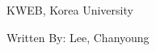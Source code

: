 \begin{titlepage}
    \centering
    \vspace*{35mm}
    \par\vspace{5mm}
    {\large KWEB, Korea University}
    \par\vspace{20mm}
    {\booktitle}
    \par\vspace{30mm}
    {\large Written By: Lee, Chanyoung}
    \par\vspace{30mm}
    {\large\version}
\end{titlepage}

\dominitoc
\tableofcontents
